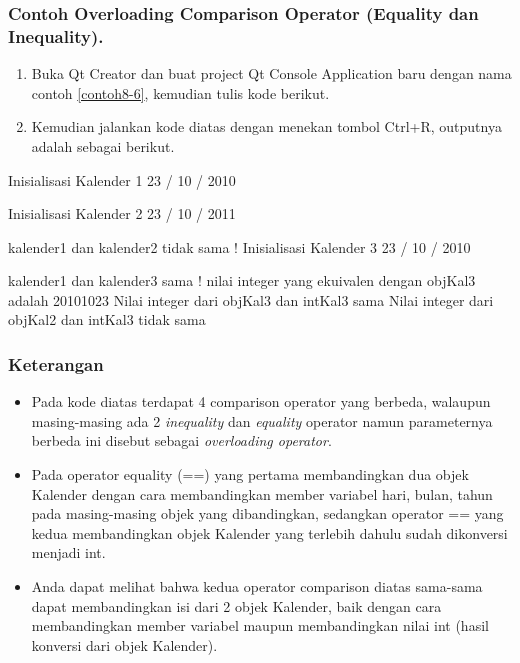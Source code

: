 \subsubsection*{Contoh Overloading Comparison Operator (Equality dan Inequality).}

\begin{enumerate}

\item
 Buka Qt Creator dan buat project Qt Console Application baru dengan
 nama contoh \ref{contoh8-6}, kemudian tulis kode berikut.




\item
 Kemudian jalankan kode diatas dengan menekan tombol Ctrl+R, outputnya
 adalah sebagai berikut.
\end{enumerate}

\begin{lcverbatim}
Inisialisasi Kalender 1
23 / 10 / 2010

Inisialisasi Kalender 2
23 / 10 / 2011

kalender1 dan kalender2 tidak sama !
Inisialisasi Kalender 3
23 / 10 / 2010

kalender1 dan kalender3 sama !
nilai integer yang ekuivalen dengan objKal3 adalah 20101023
Nilai integer dari objKal3 dan intKal3 sama
Nilai integer dari objKal2 dan intKal3 tidak sama
\end{lcverbatim}

\subsubsection*{Keterangan}

\begin{itemize}

\item
 Pada kode diatas terdapat 4 comparison operator yang berbeda, walaupun
 masing-masing ada 2 \emph{inequality} dan \emph{equality} operator
 namun parameternya berbeda ini disebut sebagai \emph{overloading
 operator}.
\item
 Pada operator equality (==) yang pertama membandingkan dua objek
 Kalender dengan cara membandingkan member variabel hari, bulan, tahun
 pada masing-masing objek yang dibandingkan, sedangkan operator == yang
 kedua membandingkan objek Kalender yang terlebih dahulu sudah
 dikonversi menjadi int.
\item
 Anda dapat melihat bahwa kedua operator comparison diatas sama-sama
 dapat membandingkan isi dari 2 objek Kalender, baik dengan cara
 membandingkan member variabel maupun membandingkan nilai int (hasil
 konversi dari objek Kalender).
\end{itemize}

